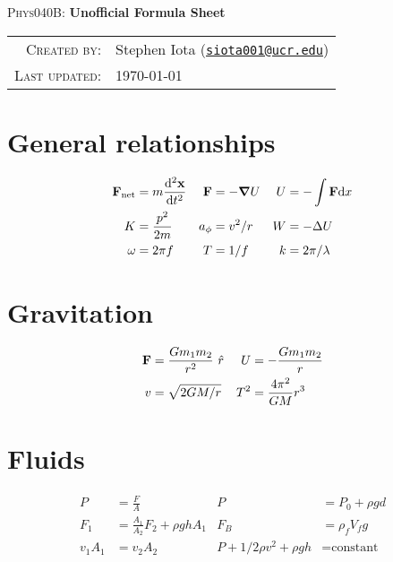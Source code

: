 \documentclass[10pt]{article}
\newcommand{\email}[1]{\texttt{\href{mailto:#1}{#1}}}
\begin{document}
\begin{center}

\Large{\textsc{Phys040B}: \textbf{Unofficial Formula Sheet}}
\end{center}
\vspace{.5mm}



\begin{tabular}{rl}
\textsc{Created by}:
&
Stephen Iota (\email{siota001@ucr.edu})
\\
\textsc{Last updated}:
&
\today
\end{tabular}


\section{General relationships}

\begin{align*}
\vb{F}_{\text{net}} &= m\dv[2]{\vb{x}}{t}
&
\vb{F} &= -\grad{U}
&
U &= -\int \vb{F} \text{d}x
\\
K &= \frac{p^2}{2m}
&
a_\phi &= v^2/r
&
W &= -\Delta U
\\
\omega &= 2\pi f
&
T &= 1/f
&
k &= 2\pi/\lambda
\end{align*}



\section{Gravitation}

\begin{align*}
\vb{F} &= \frac{Gm_1m_2}{r^2} \ \hat{r}
&
U &= -\frac{Gm_1m_2}{r}
\\
v &= \sqrt{2GM/r}
&
T^2 &= \frac{4\pi^2}{GM}r^3
\\
\end{align*}




\section{Fluids}


\begin{align*}
P &= \frac{F}{A}
&
P &= P_0 + \rho gd
\\
F_1 &= \frac{A_1}{A_2} F_2 + \rho ghA_1
&
F_B &= \rho_f V_fg
\\
v_1A_1 &= v_2A_2
&
P + 1/2\rho v^2 + \rho gh &= \text{constant}
\end{align*}
\end{document}
